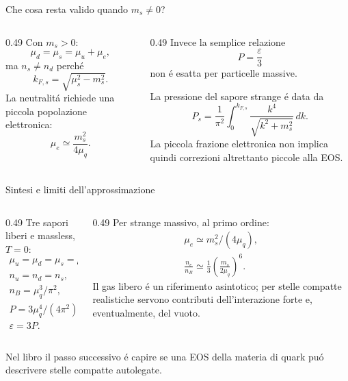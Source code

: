 \begin{frame}[t]{Che cosa resta valido quando $m_s\ne0$?}
\small
\begin{columns}[T,onlytextwidth]
\begin{column}{0.49\textwidth}
Con $m_s>0$:
\[
\mu_d=\mu_s=\mu_u+\mu_e,
\]
ma $n_s\ne n_d$ perch\'e
\[
k_{F,s}=\sqrt{\mu_s^2-m_s^2}.
\]
La neutralit\'a richiede una piccola popolazione elettronica:
\[
\mu_e\simeq\frac{m_s^2}{4\mu_q}.
\]
\end{column}
\begin{column}{0.49\textwidth}
Invece la semplice relazione
\[
P=\frac\varepsilon3
\]
non \'e esatta per particelle massive.

La pressione del sapore strange \'e data da
\[
P_s=\frac1{\pi^2}\int_0^{k_{F,s}}
\frac{k^4}{\sqrt{k^2+m_s^2}}\,dk.
\]
La piccola frazione elettronica non implica quindi correzioni altrettanto piccole alla EOS.
\end{column}
\end{columns}
\end{frame}

\begin{frame}[t]{Sintesi e limiti dell'approssimazione}
\small
\begin{columns}[T,onlytextwidth]
\begin{column}{0.49\textwidth}
Tre sapori liberi e massless, $T=0$:
\[
\begin{gathered}
\mu_u=\mu_d=\mu_s=\mu_q,\\
n_u=n_d=n_s,\qquad n_e=0,\\
n_B=\mu_q^3/\pi^2,\\
P=3\mu_q^4/(4\pi^2),\\
\varepsilon=3P.
\end{gathered}
\]
\end{column}
\begin{column}{0.49\textwidth}
Per strange massivo, al primo ordine:
\[
\begin{gathered}
\mu_e\simeq m_s^2/(4\mu_q),\\
\displaystyle\frac{n_e}{n_B}\simeq
\frac13\left(\frac{m_s}{2\mu_q}\right)^6.
\end{gathered}
\]
Il gas libero \'e un riferimento asintotico; per stelle compatte realistiche servono contributi dell'interazione forte e, eventualmente, del vuoto.
\end{column}
\end{columns}
\medskip
Nel libro il passo successivo \'e capire se una EOS della materia di quark pu\'o descrivere stelle compatte autolegate.
\end{frame}

